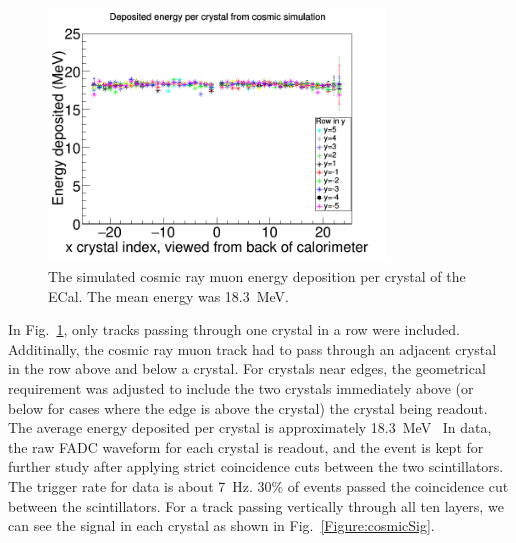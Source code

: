 \begin{figure}[H]
  \centering
      \includegraphics[width=0.8\textwidth]{pics/performance/cosmicEdep.png}
  \caption[Simulation of energy deposited per ECal module from cosmic rays]{The simulated cosmic ray muon energy deposition per crystal of the ECal. The mean energy was 18.3~MeV.}
  \label{Figure:cosmicEdep}
\end{figure}

In Fig.~\ref{Figure:cosmicEdep}, only tracks passing through one crystal in a row were included. Additinally, the cosmic ray muon track had to pass through an adjacent crystal in the row above and below a crystal. For crystals near edges, the geometrical requirement was adjusted to include the two crystals immediately above (or below for cases where the edge is above the crystal) the crystal being readout. The average energy deposited per crystal is approximately 18.3~MeV~\cite{Agashe:2014kda}
In data, the raw FADC waveform for each crystal is readout, and the event is kept for further study after applying strict coincidence cuts between the two scintillators. The trigger rate for data is about 7~Hz. 30$\%$ of events passed the coincidence cut between the scintillators. For a track passing vertically through all ten layers, we can see the signal in each crystal as shown in Fig.~\ref{Figure:cosmicSig}.

